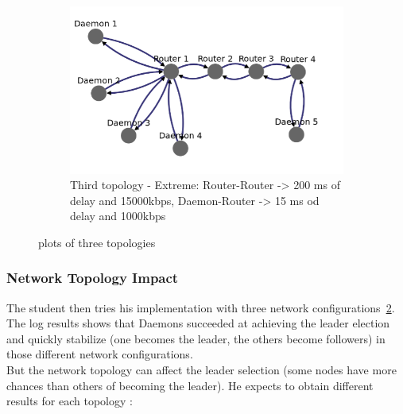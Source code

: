 \documentclass{eplmastersthesis}
\begin{document}
\begin{figure}[H]
\begin{subfigure}{0.6\textwidth}
              \includegraphics[width=1.0\linewidth]{figures/user_case/raft_topo_3.png}
              \caption{Third topology - Extreme: Router-Router -> 200 ms of delay and 15000kbps, Daemon-Router -> 15 ms od delay and 1000kbps}
              \label{fig:topo3}
            \end{subfigure}
            \caption{plots of three topologies}
            \label{fig:topologies}
          \end{figure}

        \subsubsection{Network Topology Impact}

          The student then tries his implementation with three network
          configurations~\ref{fig:topologies}.\\
          The log results shows that Daemons succeeded at achieving the leader
          election and quickly stabilize (one becomes the leader, the others
          become followers) in those different network configurations.\\
          But the network topology can affect the leader selection (some nodes
          have more chances than others of becoming the leader). He expects to
          obtain different results for each topology :
\end{document}
